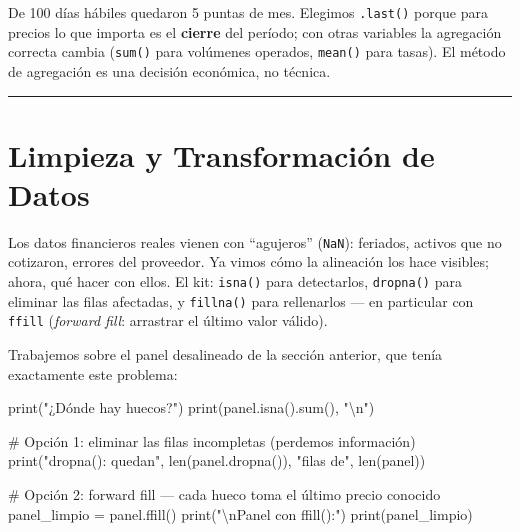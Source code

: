 \documentclass[
  spanish,
  letterpaper,
  DIV=11,
  numbers=noendperiod]{scrreprt}
\newenvironment{Shaded}{\begin{snugshade}}{\end{snugshade}}
\newcommand{\BuiltInTok}[1]{\textcolor[rgb]{0.00,0.23,0.31}{#1}}
\newcommand{\CharTok}[1]{\textcolor[rgb]{0.13,0.47,0.30}{#1}}
\newcommand{\CommentTok}[1]{\textcolor[rgb]{0.37,0.37,0.37}{#1}}
\newcommand{\NormalTok}[1]{\textcolor[rgb]{0.00,0.23,0.31}{#1}}
\newcommand{\OperatorTok}[1]{\textcolor[rgb]{0.37,0.37,0.37}{#1}}
\newcommand{\StringTok}[1]{\textcolor[rgb]{0.13,0.47,0.30}{#1}}
\begin{document}
De 100 días hábiles quedaron 5 puntas de mes. Elegimos \texttt{.last()}
porque para precios lo que importa es el \textbf{cierre} del período;
con otras variables la agregación correcta cambia (\texttt{sum()} para
volúmenes operados, \texttt{mean()} para tasas). El método de agregación
es una decisión económica, no técnica.

\begin{center}\rule{0.5\linewidth}{0.5pt}\end{center}

\section{Limpieza y Transformación de
Datos}\label{limpieza-y-transformaciuxf3n-de-datos}

Los datos financieros reales vienen con ``agujeros'' (\texttt{NaN}):
feriados, activos que no cotizaron, errores del proveedor. Ya vimos cómo
la alineación los hace visibles; ahora, qué hacer con ellos. El kit:
\texttt{isna()} para detectarlos, \texttt{dropna()} para eliminar las
filas afectadas, y \texttt{fillna()} para rellenarlos --- en particular
con \texttt{ffill} (\emph{forward fill}: arrastrar el último valor
válido).

Trabajemos sobre el panel desalineado de la sección anterior, que tenía
exactamente este problema:

\label{limpieza-ejemplo}
\begin{Shaded}
\begin{Highlighting}[]
\BuiltInTok{print}\NormalTok{(}\StringTok{"¿Dónde hay huecos?"}\NormalTok{)}
\BuiltInTok{print}\NormalTok{(panel.isna().}\BuiltInTok{sum}\NormalTok{(), }\StringTok{"}\CharTok{\textbackslash{}n}\StringTok{"}\NormalTok{)}

\CommentTok{\# Opción 1: eliminar las filas incompletas (perdemos información)}
\BuiltInTok{print}\NormalTok{(}\StringTok{"dropna(): quedan"}\NormalTok{, }\BuiltInTok{len}\NormalTok{(panel.dropna()), }\StringTok{"filas de"}\NormalTok{, }\BuiltInTok{len}\NormalTok{(panel))}

\CommentTok{\# Opción 2: forward fill — cada hueco toma el último precio conocido}
\NormalTok{panel\_limpio }\OperatorTok{=}\NormalTok{ panel.ffill()}
\BuiltInTok{print}\NormalTok{(}\StringTok{"}\CharTok{\textbackslash{}n}\StringTok{Panel con ffill():"}\NormalTok{)}
\BuiltInTok{print}\NormalTok{(panel\_limpio)}
\end{Highlighting}
\end{Shaded}
\end{document}
